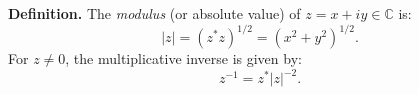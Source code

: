 \textbf{Definition.} The \textit{modulus} (or absolute value) of $z = x + iy \in \mathbb{C}$ is:
\[
|z| = (z^* z)^{1/2} = (x^2 + y^2)^{1/2}.
\]
For $z \neq 0$, the multiplicative inverse is given by:
\[
z^{-1} = z^* |z|^{-2}.
\]
